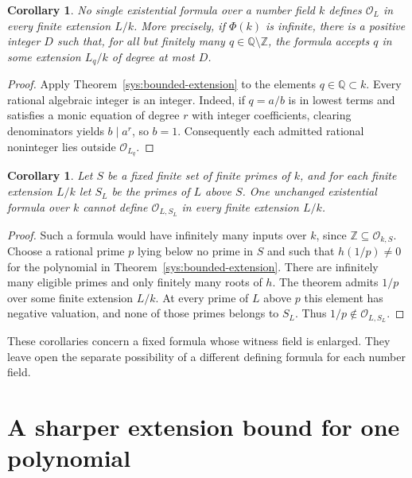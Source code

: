 \documentclass[11pt,a4paper]{article}
\newtheorem{corollary}[theorem]{Corollary}
\theoremstyle{definition}
\begin{document}
\begin{corollary}\label{sys:no-uniform-integers}
No single existential formula over a number field $k$ defines
$\mathcal O_L$ in every finite extension $L/k$. More precisely,
if $\Phi(k)$ is infinite, there is a positive integer $D$ such
that, for all but finitely many $q\in\mathbb Q\setminus\mathbb Z$,
the formula accepts $q$ in some extension $L_q/k$ of degree at
most $D$.
\end{corollary}
\begin{proof}
Apply Theorem~\ref{sys:bounded-extension} to the elements
$q\in\mathbb Q\subset k$. Every rational algebraic integer is
an integer. Indeed, if $q=a/b$ is in lowest terms and satisfies
a monic equation of degree $r$ with integer coefficients,
clearing denominators yields $b\mid a^r$, so $b=1$.
Consequently each admitted rational noninteger lies outside
$\mathcal O_{L_q}$.
\end{proof}

\begin{corollary}\label{sys:no-uniform-s-integers}
Let $S$ be a fixed finite set of finite primes of $k$, and for
each finite extension $L/k$ let $S_L$ be the primes of $L$
above $S$. One unchanged existential formula over $k$ cannot
define $\mathcal O_{L,S_L}$ in every finite extension $L/k$.
\end{corollary}
\begin{proof}
Such a formula would have infinitely many inputs over $k$,
since $\mathbb Z\subseteq\mathcal O_{k,S}$. Choose a rational
prime $p$ lying below no prime in $S$ and such that $h(1/p)\ne0$
for the polynomial in Theorem~\ref{sys:bounded-extension}.
There are infinitely many eligible primes and only finitely
many roots of $h$. The theorem admits $1/p$ over some finite
extension $L/k$. At every prime of $L$ above $p$ this element
has negative valuation, and none of those primes belongs to
$S_L$. Thus $1/p\notin\mathcal O_{L,S_L}$.
\end{proof}

These corollaries concern a fixed formula whose witness field
is enlarged. They leave open the separate possibility of a
different defining formula for each number field.

\section{A sharper extension bound for one polynomial}
\end{document}
